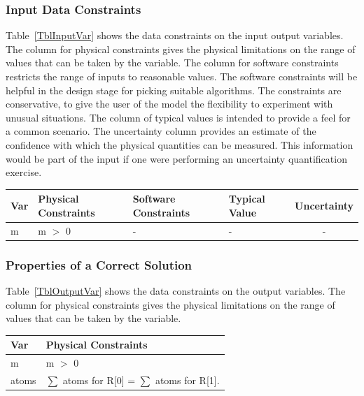 \documentclass[12pt]{article}
\begin{document}
\subsubsection{Input Data Constraints} \label{sec_DataConstraints}    

Table~\ref{TblInputVar} shows the data constraints on the input output
variables.  The column for physical constraints gives the physical limitations
on the range of values that can be taken by the variable.  The column for
software constraints restricts the range of inputs to reasonable values.  The
software constraints will be helpful in the design stage for picking suitable
algorithms.  The constraints are conservative, to give the user of the model the
flexibility to experiment with unusual situations.  The column of typical values
is intended to provide a feel for a common scenario.  The uncertainty column
provides an estimate of the confidence with which the physical quantities can be
measured.  This information would be part of the input if one were performing an
uncertainty quantification exercise.


\begin{table}[!h]
  \caption{Input Variables} \label{TblInputVar}
  \renewcommand{\arraystretch}{1.2}
\noindent \begin{longtable*}{l l l l c} 
  \toprule
  \textbf{Var} & \textbf{Physical Constraints} & \textbf{Software Constraints} &
                             \textbf{Typical Value} & \textbf{Uncertainty}\\
  \midrule 
      m  &  m $>$ 0  &  - & - & - \\
     
     \bottomrule
\end{longtable*}
\end{table}


\subsubsection{Properties of a Correct Solution} \label{sec_CorrectSolution}

\noindent
Table~\ref{TblOutputVar} shows the data constraints on the output variables. The column
for physical constraints gives the physical limitations on the range of values that can be
taken by the variable.

\begin{table}[!h]
\caption{Output Variables} \label{TblOutputVar}
\renewcommand{\arraystretch}{1.2}
\noindent \begin{longtable*}{l l} 
  \toprule
  \textbf{Var} & \textbf{Physical Constraints} \\
  \midrule 
  m & m $>$ 0 \\
  atoms &  $ \sum $ atoms for R[0] =  $\sum$ atoms for R[1].   \\
   \bottomrule
\end{longtable*}
\end{table}
\end{document}
